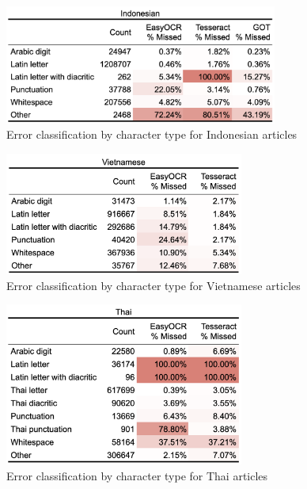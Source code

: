 \documentclass[12pt,oneside]{memoir}
\begin{document}
\begin{figure}[ht]
    \centering
    \includegraphics[width=0.8\textwidth]{images/error-classification-indonesian.png}
    \caption{Error classification by character type for Indonesian articles}
    \label{figure:error-classification-indonesian}
\end{figure}

\begin{figure}[ht]
    \centering
    \includegraphics[width=0.7\textwidth]{images/error-classification-vietnamese.png}
    \caption{Error classification by character type for Vietnamese articles}
    \label{figure:error-classification-vietnamese}
\end{figure}

\begin{figure}[ht]
    \centering
    \includegraphics[width=0.7\textwidth]{images/error-classification-thai.png}
    \caption{Error classification by character type for Thai articles}
    \label{figure:error-classification-thai}
\end{figure}
\end{document}
